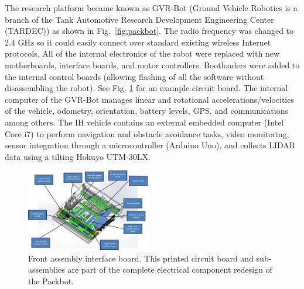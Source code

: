 The research platform became known as GVR-Bot (Ground Vehicle Robotics is a branch of the Tank Automotive Research Development Engineering Center (TARDEC)) as shown in Fig.~\ref{fig:packbot}. The radio frequency was changed to 2.4 GHz so it could easily connect over standard existing wireless Internet protocols. All of the internal electronics of the robot were replaced with new motherboards, interface boards, and motor controllers. Bootloaders were added to the internal control boards (allowing flashing of all the software without disassembling the robot). See Fig. \ref{fig:pcb} for an example circuit board. The internal computer of the GVR-Bot manages linear and rotational accelerations/velocities of the vehicle, odometry, orientation, battery levels, GPS, and communications among others. The IH vehicle contains an external embedded computer (Intel Core i7) to perform navigation and obstacle avoidance tasks, video monitoring, sensor integration through a microcontroller (Arduino Uno), and collects LIDAR data using a tilting Hokuyo UTM-30LX.   

\begin{figure}[b]
	\centering
	\includegraphics[width=0.48\textwidth]{./pictures/pcb.jpg}
	\caption{Front assembly interface board. This printed circuit board and sub-assemblies are part of the complete electrical component redesign of the Packbot.}
	\label{fig:pcb}
\end{figure}

